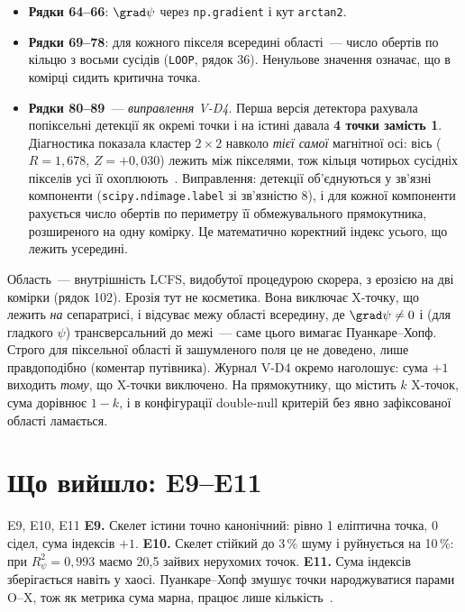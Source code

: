 
\begin{itemize}
\item \textbf{Рядки 64--66}: $\grad\psi$ через \texttt{np.gradient} і кут \texttt{arctan2}.
\item \textbf{Рядки 69--78}: для кожного пікселя всередині області~--- число обертів по кільцю з восьми сусідів (\texttt{LOOP}, рядок 36). Ненульове значення означає, що в комірці сидить критична точка.
\item \textbf{Рядки 80--89}~--- \emph{виправлення V-D4}. Перша версія детектора рахувала попіксельні детекції як окремі точки і на істині давала \textbf{4 точки замість 1}. Діагностика показала кластер $2\times2$ навколо \emph{тієї самої} магнітної осі: вісь ($R=1{,}678$, $Z=+0{,}030$) лежить між пікселями, тож кільця чотирьох сусідніх пікселів усі її охоплюють~\cite{RegVerif}. Виправлення: детекції об'єднуються у зв'язні компоненти (\texttt{scipy.ndimage.label} зі зв'язністю 8), і для кожної компоненти рахується число обертів по периметру її обмежувального прямокутника, розширеного на одну комірку. Це математично коректний індекс усього, що лежить усередині.
\end{itemize}


Область~--- внутрішність LCFS, видобутої процедурою скорера, з ерозією на дві комірки (рядок 102). Ерозія тут не косметика. Вона виключає X-точку, що лежить \emph{на} сепаратрисі, і відсуває межу області всередину, де $\grad\psi\neq0$ і (для гладкого $\psi$) трансверсальний до межі~--- саме цього вимагає Пуанкаре--Хопф. Строго для піксельної області й зашумленого поля це не доведено, лише правдоподібно (коментар путівника). Журнал V-D4 окремо наголошує: сума $+1$ виходить \emph{тому}, що X-точки виключено. На прямокутнику, що містить $k$ X-точок, сума дорівнює $1-k$, і в конфігурації double-null критерій без явно зафіксованої області ламається.

\section{Що вийшло: E9--E11}\label{sec:g05-results}

\begin{established}{E9, E10, E11}
\textbf{E9.} Скелет істини точно канонічний: рівно 1 еліптична точка, 0 сідел, сума індексів $+1$.
\textbf{E10.} Скелет стійкий до 3\,\% шуму і руйнується на 10\,\%: при $R^2_\psi=0{,}993$ маємо 20,5 зайвих нерухомих точок.
\textbf{E11.} Сума індексів зберігається навіть у хаосі. Пуанкаре--Хопф змушує точки народжуватися парами O--X, тож як метрика сума марна, працює лише кількість~\cite{RegEst}.
\end{established}

